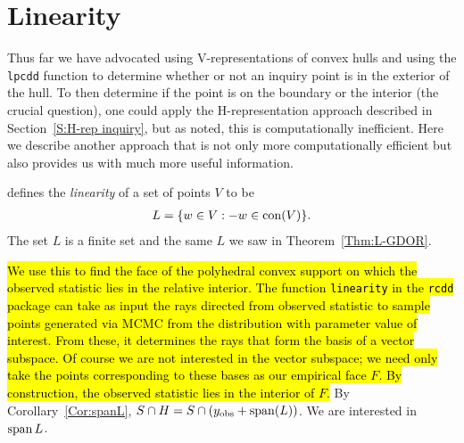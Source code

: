 \section{Linearity}\label{S:linearity}
Thus far we have advocated using V-representations of convex hulls and using
the \texttt{lpcdd} function to determine whether or not an inquiry point is
in the exterior of the hull.  To then determine if the point is on the boundary
or the interior (the crucial question), one could apply the 
H-representation approach described in 
Section~\ref{S:H-rep inquiry}, but as noted, this is computationally inefficient.
Here we describe another approach that is not only more computationally efficient
but also provides us with much more useful information.

\citet{Geyer:gdor} defines the \emph{linearity} of a set of points $V$ to be
\begin{align*}
	L = \{ w \in V: -w \in \operatorname{con}( V ) \}.
\end{align*}
The set $L$ is a finite set and the same $L$ we saw in Theorem~\ref{Thm:L-GDOR}.

\hl{We use this to find the face of the polyhedral convex support on 
which the observed 
statistic lies in the relative interior.  The function \texttt{linearity} 
in the \texttt{rcdd} package can take as input the rays directed from observed 
statistic to sample points generated via MCMC from the distribution with 
parameter value of interest.  
From these, it determines the rays that form the basis of a vector subspace.  
Of course we are not interested in the vector subspace; we need only take the points 
corresponding to these bases as our empirical face $F$.  
By construction, the observed 
statistic lies in the interior of $F$.}  By Corollary~\ref{Cor:spanL}, 
$S \cap H = S \cap(y_{\text{obs}} + \operatorname{span} (L))$.  We are interested in $\operatorname{span} L$.


